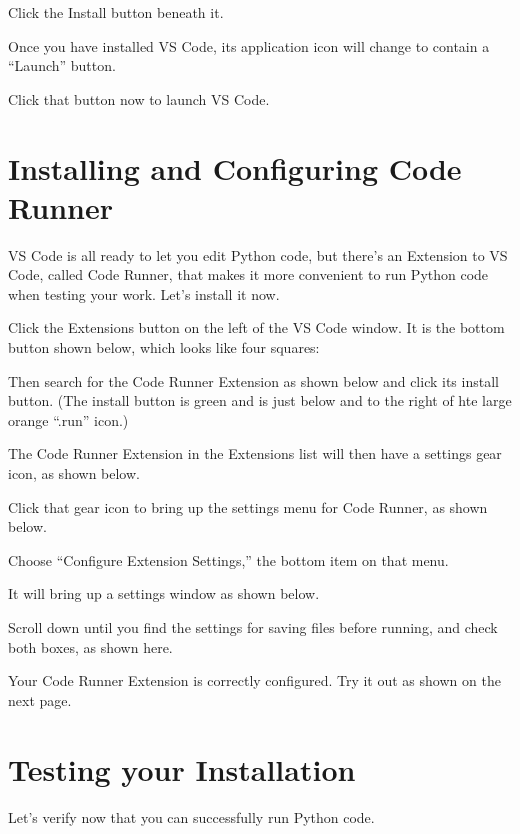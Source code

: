\documentclass[letterpaper,10pt,english]{sphinxmanual}
\begin{document}
Click the Install button beneath it.

Once you have installed VS Code, its application icon will change to
contain a “Launch” button.



Click that button now to launch VS Code.


\section{Installing and Configuring Code Runner}
\label{\detokenize{vs-code-installation:installing-and-configuring-code-runner}}
VS Code is all ready to let you edit Python code, but there’s an
Extension to VS Code, called Code Runner, that makes it more convenient
to run Python code when testing your work. Let’s install it now.

Click the Extensions button on the left of the VS Code window.  It is the bottom button shown below, which looks like four squares:



Then search for the Code Runner Extension as shown below and click its
install button.  (The install button is green and is just below and to the right of hte large orange “.run” icon.)



The Code Runner Extension in the Extensions list will then have a
settings gear icon, as shown below.



Click that gear icon to bring up the settings menu for Code Runner, as shown below.



Choose “Configure Extension Settings,” the bottom item on that menu.

It will bring up a settings window as shown below.



Scroll down until you find the settings for saving files before running,
and check both boxes, as shown here.



Your Code Runner Extension is correctly configured. Try it out as shown
on the next page.


\section{Testing your Installation}
\label{\detokenize{vs-code-installation:testing-your-installation}}
Let’s verify now that you can successfully run Python code.
\end{document}
